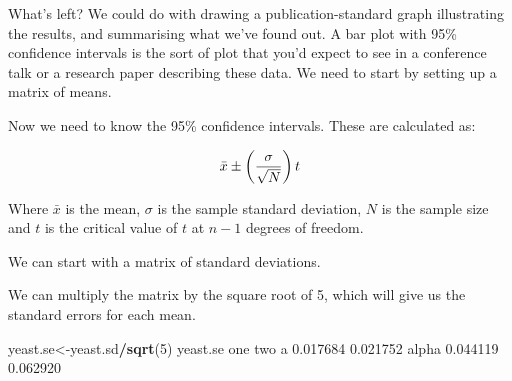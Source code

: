 \documentclass[
]{book}
\newenvironment{Shaded}{\begin{snugshade}}{\end{snugshade}}
\newcommand{\DecValTok}[1]{\textcolor[rgb]{0.00,0.00,0.81}{#1}}
\newcommand{\FloatTok}[1]{\textcolor[rgb]{0.00,0.00,0.81}{#1}}
\newcommand{\KeywordTok}[1]{\textcolor[rgb]{0.13,0.29,0.53}{\textbf{#1}}}
\newcommand{\NormalTok}[1]{#1}
\newcommand{\OperatorTok}[1]{\textcolor[rgb]{0.81,0.36,0.00}{\textbf{#1}}}
\begin{document}
What's left? We could do with drawing a publication-standard graph illustrating the results, and summarising what we've found out. A bar plot with 95\% confidence intervals is the sort of plot that you'd expect to see in a conference talk or a research paper describing these data. We need to start by setting up a matrix of means.

\begin{Shaded}
\end{Shaded}

Now we need to know the 95\% confidence intervals. These are calculated as:

\[ \Large \bar{x} \pm \left( \frac{\sigma}{\sqrt{N}} \right) t \]

Where \(\bar{x}\) is the mean, \(\sigma\) is the sample standard deviation, \(N\) is the sample size and \(t\) is the critical value of \(t\) at \(n-1\) degrees of freedom.

We can start with a matrix of standard deviations.

\begin{Shaded}
\end{Shaded}

We can multiply the matrix by the square root of 5, which will give us the standard errors for each mean.

\begin{Shaded}
\begin{Highlighting}[]
\NormalTok{yeast.se<-yeast.sd}\OperatorTok{/}\KeywordTok{sqrt}\NormalTok{(}\DecValTok{5}\NormalTok{)}
\NormalTok{yeast.se}
\NormalTok{           one      two}
\NormalTok{a     }\FloatTok{0.017684} \FloatTok{0.021752}
\NormalTok{alpha }\FloatTok{0.044119} \FloatTok{0.062920}
\end{Highlighting}
\end{Shaded}
\end{document}
